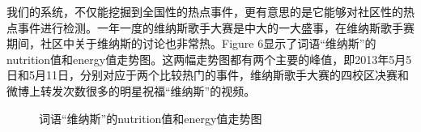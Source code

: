 \documentclass[a4paper]{article}
\begin{document}
\indent 我们的系统，不仅能挖掘到全国性的热点事件，更有意思的是它能够对社区性的热点事件进行检测。一年一度的维纳斯歌手大赛是中大的一大盛事，在维纳斯歌手赛期间，社区中关于维纳斯的讨论也非常热。Figure 6显示了词语“维纳斯”的nutrition值和energy值走势图。这两幅走势图都有两个主要的峰值，即2013年5月5日和5月11日，分别对应于两个比较热门的事件，维纳斯歌手大赛的四校区决赛和微博上转发次数很多的明星祝福“维纳斯”的视频。
\begin{figure}[H]
\centering
{}
\caption{词语“维纳斯”的nutrition值和energy值走势图}
\label{fig:6}
\end{figure}
\end{document}
